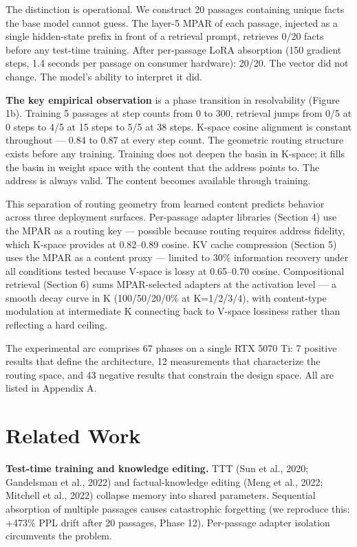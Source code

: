 The distinction is operational. We construct 20 passages containing unique facts the base model cannot guess. The layer-5 MPAR of each passage, injected as a single hidden-state prefix in front of a retrieval prompt, retrieves 0/20 facts before any test-time training. After per-passage LoRA absorption (150 gradient steps, 1.4 seconds per passage on consumer hardware): 20/20. The vector did not change. The model's ability to interpret it did.

\textbf{The key empirical observation} is a phase transition in resolvability (Figure 1b). Training 5 passages at step counts from 0 to 300, retrieval jumps from 0/5 at 0 steps to 4/5 at 15 steps to 5/5 at 38 steps. K-space cosine alignment is constant throughout --- 0.84 to 0.87 at every step count. The geometric routing structure exists before any training. Training does not deepen the basin in K-space; it fills the basin in weight space with the content that the address points to. The address is always valid. The content becomes available through training.

This separation of routing geometry from learned content predicts behavior across three deployment surfaces. Per-passage adapter libraries (Section 4) use the MPAR as a routing key --- possible because routing requires address fidelity, which K-space provides at 0.82--0.89 cosine. KV cache compression (Section 5) uses the MPAR as a content proxy --- limited to 30\% information recovery under all conditions tested because V-space is lossy at 0.65--0.70 cosine. Compositional retrieval (Section 6) sums MPAR-selected adapters at the activation level --- a smooth decay curve in K (100/50/20/0\% at K=1/2/3/4), with content-type modulation at intermediate K connecting back to V-space lossiness rather than reflecting a hard ceiling.

The experimental arc comprises 67 phases on a single RTX 5070 Ti: 7 positive results that define the architecture, 12 measurements that characterize the routing space, and 43 negative results that constrain the design space. All are listed in Appendix A.

\section{Related Work}\label{related-work}

\textbf{Test-time training and knowledge editing.} TTT (Sun et al., 2020; Gandelsman et al., 2022) and factual-knowledge editing (Meng et al., 2022; Mitchell et al., 2022) collapse memory into shared parameters. Sequential absorption of multiple passages causes catastrophic forgetting (we reproduce this: +473\% PPL drift after 20 passages, Phase 12). Per-passage adapter isolation circumvents the problem.


